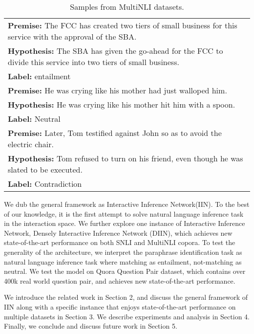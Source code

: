 \documentclass{article} \usepackage{iclr2018_conference,times}
\begin{document}
\begin{table}
\centering
\begin{tabular}{p{}}
\toprule

\textbf{Premise:}
The FCC has created two tiers of small business for this service with the approval of the SBA. \\
\textbf{Hypothesis:} The SBA has given the go-ahead for the FCC to divide this service into two tiers of small business. \\
\textbf{Label:} entailment \\
\vspace{-0.1em}
\textbf{Premise:}
He was crying like his mother had just walloped him. \\
\textbf{Hypothesis:} He was crying like his mother hit him with a spoon. \\
\textbf{Label:} Neutral\\
\vspace{-0.1em}
\textbf{Premise:}
Later, Tom testified against John so as to avoid the electric chair.\\
\textbf{Hypothesis:} Tom refused to turn on his friend, even though he was slated to be executed.
\\
\textbf{Label:} Contradiction\\
\bottomrule
\end{tabular}
\caption{Samples from MultiNLI datasets.}\label{tab:NLI_sample}
\end{table}

We dub the general framework as Interactive Inference Network(IIN). To the best of our knowledge, it is the first attempt to solve natural language inference task in the interaction space. We further explore one instance of Interactive Inference Network, Densely Interactive Inference Network (DIIN), which achieves new state-of-the-art performance on both SNLI and MultiNLI copora. To test the generality of the architecture, we interpret the paraphrase identification task as natural language inference task where matching as entailment, not-matching as neutral. We test the model on Quora Question Pair dataset, which contains over 400k real world question pair, and achieves new state-of-the-art performance.

We introduce the related work in Section 2, and discuss the general framework of IIN along with a specific instance that enjoys state-of-the-art performance on multiple datasets in Section 3. We describe experiments and analysis in Section 4. Finally, we conclude and discuss future work in Section 5.
\end{document}

